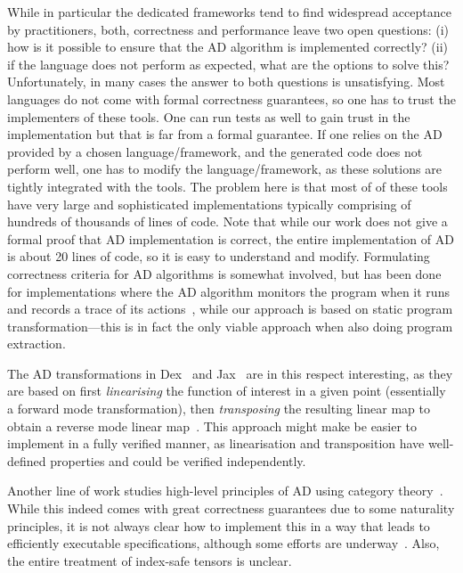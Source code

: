 While in particular the dedicated frameworks tend to find widespread acceptance
by practitioners, both, correctness and performance leave two open questions:
(i) how is it possible to ensure that the AD algorithm is implemented correctly?
(ii) if the language does not perform as expected, what are the options to solve
this? Unfortunately, in many cases the answer to both questions is unsatisfying.
Most languages do not come with formal correctness guarantees, so one has to
trust the implementers of these tools. One can run tests as well to gain trust
in the implementation but that is far from a formal guarantee. If one relies on
the AD provided by a chosen language/framework, and the generated code does not
perform well, one has to modify the language/framework, as these solutions are
tightly integrated with the tools. The problem here is that most of of these
tools have very large and sophisticated implementations typically comprising of
hundreds of thousands of lines of code. Note that while our work does not give a
formal proof that AD implementation is correct, the entire implementation of AD
is about 20 lines of code, so it is easy to understand and modify. Formulating
correctness criteria for AD algorithms is somewhat involved, but has been done
for implementations where the AD algorithm monitors the program when it runs and
records a trace of its actions~\cite{de2023verifying}, while our approach is
based on static program transformation---this is in fact the only viable
approach when also doing program extraction.

The AD transformations in Dex~\cite{10.1145/3473593} and Jax~\cite{ad-jax} are
in this respect interesting, as they are based on first \emph{linearising} the
function of interest in a given point (essentially a forward mode
transformation), then \emph{transposing} the resulting linear map to obtain a
reverse mode linear map~\cite{radul2023you}. This approach might make be easier
to implement in a fully verified manner, as linearisation and transposition have
well-defined properties and could be verified independently.

Another line of work studies high-level principles of AD using category
theory~\cite{ad-theor1, ad-theor2, ad-theor3}. While this indeed comes with
great correctness guarantees due to some naturality principles, it is not always
clear how to implement this in a way that leads to efficiently executable
specifications, although some efforts are underway~\cite{10.1145/3632878}. Also,
the entire treatment of index-safe tensors is unclear.

